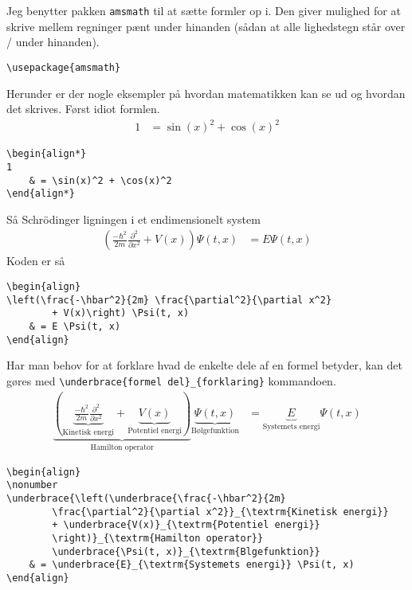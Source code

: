 \documentclass[11pt,a4paper,fleqn]{article}
\begin{document}
Jeg benytter pakken \verb!amsmath! til at sætte formler op i. 
Den giver mulighed for at skrive mellem regninger pænt under
hinanden (sådan at alle lighedstegn står over / under hinanden).
%
\begin{lstlisting}
\usepackage{amsmath}
\end{lstlisting}
%
Herunder er der nogle eksempler på hvordan matematikken kan se ud og
hvordan det skrives.
Først idiot formlen.
%
\begin{align*}
1
	& = \sin(x)^2 + \cos(x)^2 
\end{align*}
%
\begin{lstlisting}
\begin{align*}
1
	& = \sin(x)^2 + \cos(x)^2 
\end{align*}
\end{lstlisting}
%
Så Schrödinger ligningen i et endimensionelt system 
%
\begin{align}
\left(\frac{-\hbar^2}{2m} \frac{\partial^2}{\partial x^2} 
		+ V(x)\right) \Psi(t, x)
	& = E \Psi(t, x)
\end{align}
%
Koden er så
%
\begin{lstlisting}
\begin{align}
\left(\frac{-\hbar^2}{2m} \frac{\partial^2}{\partial x^2} 
		+ V(x)\right) \Psi(t, x)
	& = E \Psi(t, x)
\end{align}
\end{lstlisting}
%
Har man behov for at forklare hvad de enkelte dele af en formel
betyder, kan det gøres med 
\verb!\underbrace{formel del}_{forklaring}! kommandoen.
%
\begin{align}
\nonumber
\underbrace{\left(\underbrace{\frac{-\hbar^2}{2m} 
		\frac{\partial^2}{\partial x^2}}_{\textrm{Kinetisk energi}} 
		+ \underbrace{V(x)}_{\textrm{Potentiel energi}}
		\right)}_{\textrm{Hamilton operator}}
		\underbrace{\Psi(t, x)}_{\textrm{Bølgefunktion}}
	& = \underbrace{E}_{\textrm{Systemets energi}} \Psi(t, x)
\end{align}
%
\begin{lstlisting}
\begin{align}
\nonumber
\underbrace{\left(\underbrace{\frac{-\hbar^2}{2m} 
		\frac{\partial^2}{\partial x^2}}_{\textrm{Kinetisk energi}} 
		+ \underbrace{V(x)}_{\textrm{Potentiel energi}}
		\right)}_{\textrm{Hamilton operator}}
		\underbrace{\Psi(t, x)}_{\textrm{Blgefunktion}}
	& = \underbrace{E}_{\textrm{Systemets energi}} \Psi(t, x)
\end{align}
\end{lstlisting}



\end{document}
